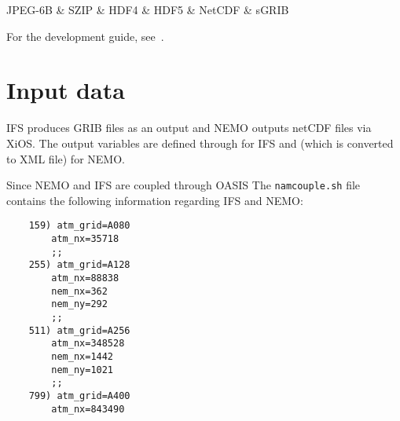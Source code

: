\begin{dependency}
\begin{deptext}
JPEG-6B \& SZIP \& HDF4 \& HDF5 \& NetCDF \& sGRIB \\
\end{deptext}
\end{dependency}

For the development guide, see~\cite{dev-guide}.


\section{Input data}
IFS produces GRIB files as an output and NEMO outputs netCDF files via XiOS. 
The output variables are defined through  for IFS and  (which is converted to XML file) for NEMO.

Since NEMO and IFS are coupled through OASIS \cite{TM673}
The \texttt{namcouple.sh} file contains the following information regarding IFS and NEMO:

\begin{lstlisting}
    159) atm_grid=A080
        atm_nx=35718
        ;;
    255) atm_grid=A128
        atm_nx=88838
        nem_nx=362
        nem_ny=292
        ;;
    511) atm_grid=A256
        atm_nx=348528
        nem_nx=1442
        nem_ny=1021
        ;;
    799) atm_grid=A400
        atm_nx=843490  
\end{lstlisting}









